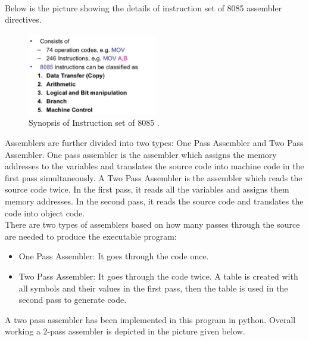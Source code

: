 \documentclass[12pt]{article}
\begin{document}
 \\Below is the picture showing the details of instruction set of 8085 assembler directives.
 \begin{figure}[H]
\centering
\includegraphics[width=0.5\textwidth]{inst.png}
\caption{\label{fig:inst_set}Synopsis of Instruction set of 8085 .}
\end{figure}
 
Assemblers are further divided into two types: One Pass Assembler and Two Pass Assembler. One pass assembler is the assembler which assigns the memory addresses to the variables and translates the source code into machine code in the first pass simultaneously. A Two Pass Assembler is the assembler which reads the source code twice. In the first pass, it reads all the variables and assigns them memory addresses. In the second pass, it reads the source code and translates the code into object code.\\

There are two types of assemblers based on how many passes through the source are needed to produce the executable program:
\begin{itemize}
  \item  One Pass Assembler: It goes through the code once.
   \item Two Pass Assembler: It goes through the code twice. A table is created with all symbols and their values in the first pass, then the table is used in the second pass to generate code.
\end{itemize}
A two pass assembler has been implemented in this program in python.
Overall working a 2-pass assembler is depicted in the picture given below.
\end{document}
